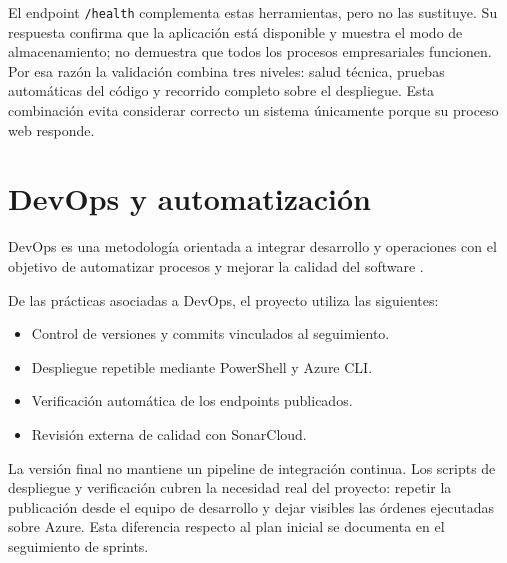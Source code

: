 El endpoint \texttt{/health} complementa estas herramientas, pero no las sustituye. Su respuesta confirma que la aplicación está disponible y muestra el modo de almacenamiento; no demuestra que todos los procesos empresariales funcionen. Por esa razón la validación combina tres niveles: salud técnica, pruebas automáticas del código y recorrido completo sobre el despliegue. Esta combinación evita considerar correcto un sistema únicamente porque su proceso web responde.

\section{DevOps y automatización}

DevOps es una metodología orientada a integrar desarrollo y operaciones con el objetivo de automatizar procesos y mejorar la calidad del software \cite{bojja2020_devops}.

De las prácticas asociadas a DevOps, el proyecto utiliza las siguientes:

\begin{itemize}
    \item Control de versiones y commits vinculados al seguimiento.
    \item Despliegue repetible mediante PowerShell y Azure CLI.
    \item Verificación automática de los endpoints publicados.
    \item Revisión externa de calidad con SonarCloud.
\end{itemize}

La versión final no mantiene un pipeline de integración continua. Los scripts de despliegue y verificación cubren la necesidad real del proyecto: repetir la publicación desde el equipo de desarrollo y dejar visibles las órdenes ejecutadas sobre Azure. Esta diferencia respecto al plan inicial se documenta en el seguimiento de sprints.
